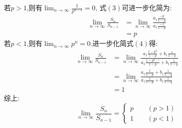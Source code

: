 \begin{questions}
\begin{solution}
		若$p>1$,则有$\displaystyle\lim_{n\to\infty}\frac{1}{p^{n-1}} = 0$, 式$(3)$可进一步化简为:
		\begin{align*}
			\lim_{n\to\infty}\frac{S_n}{S_{n-1}} & = \lim_{n\to\infty}\frac{a_1\frac{-p}{1-p}}{a_1\frac{-1}{1-p}} \\
			                                     & = p
		\end{align*}
		若$p<1$,则有$\displaystyle\lim_{n\to\infty}p^n=0$.进一步化简式$(4)$得:
		\begin{align*}
			\lim_{n\to\infty}\frac{S_n}{S_{n-1}} & =
			\lim_{n\to\infty}\frac{a_1\frac{1-p^n}{1-p} + b_1\frac{1}{1-q}}{a_1\frac{1-p^{n-1}}{1-p} + b_1\frac1{1-q}}
			\\
			                                     & = \lim_{n\to\infty}\frac{a_1\frac{1}{1-p}
			+b_1\frac1{1-q}}{a_1\frac{1}{1-p} + b_1\frac1{1-q}}                              \\
			                                     & = 1
		\end{align*}
		综上:
		\begin{equation*}
			\lim_{n\to\infty}\frac{S_n}{S_{n-1}}  =
			\begin{cases}
				p \qquad (p >1) \\
				1 \qquad (p < 1)
			\end{cases}
		\end{equation*}
	\end{solution}


\end{questions}
